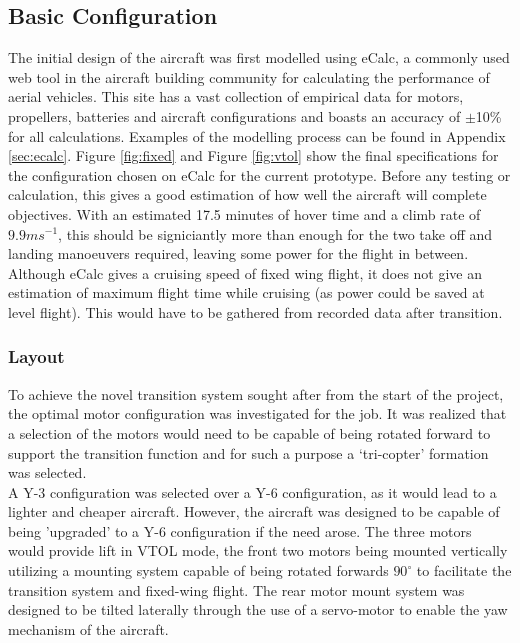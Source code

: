 \subsection{Basic Configuration}
The initial design of the aircraft was first modelled using eCalc\cite{ref:ecalc}, a commonly used web tool in the aircraft building community for calculating the performance of aerial vehicles. This site has a vast collection of empirical data for motors, propellers, batteries and aircraft configurations and boasts an accuracy of $\pm$10\% for all calculations. Examples of the modelling process can be found in Appendix \ref{sec:ecalc}. Figure \ref{fig:fixed} and Figure \ref{fig:vtol} show the final specifications for the configuration chosen on eCalc for the current prototype. Before any testing or calculation, this gives a good estimation of how well the aircraft will complete objectives. With an estimated 17.5 minutes of hover time and a climb rate of $9.9ms^{-1}$, this should be signiciantly more than enough for the two take off and landing manoeuvers required, leaving some power for the flight in between. Although eCalc gives a cruising speed of fixed wing flight, it does not give an estimation of maximum flight time while cruising (as power could be saved at level flight). This would have to be gathered from recorded data after transition.

\subsubsection*{Layout}
To achieve the novel transition system sought after from the start of the project, the optimal motor configuration was investigated for the job. It was realized that a selection of the motors would need to be capable of being rotated forward to support the transition function and for such a purpose a `tri-copter' formation was selected.\\
		
A Y-3 configuration was selected over a Y-6 configuration, as it would lead to a lighter and cheaper aircraft. However, the aircraft was designed to be capable of being 'upgraded' to a Y-6 configuration if the need arose. The three motors would provide lift in VTOL mode, the front two motors being mounted vertically utilizing a mounting system capable of being rotated forwards $90^{\circ}$ to facilitate the transition system and fixed-wing flight. The rear motor mount system was designed to be tilted laterally through the use of a servo-motor to enable the yaw mechanism of the aircraft.

